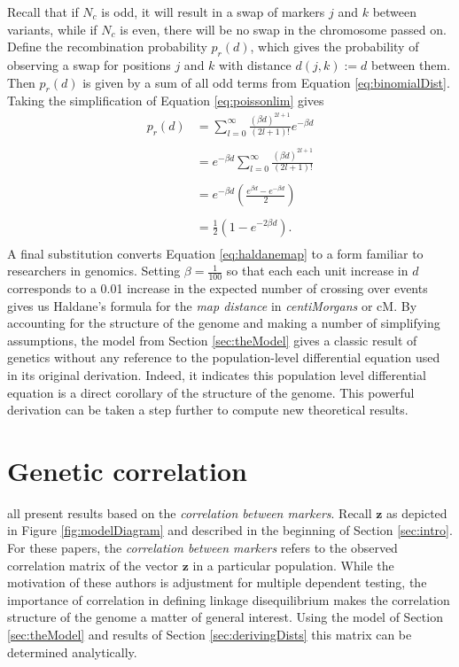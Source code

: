 \documentclass{article}
\newcommand{\ve}[1]{\mathbf{#1}}           %
\begin{document}
Recall that if $N_c$ is odd, it will result in a swap of markers $j$ and $k$ between variants, while if $N_c$ is even, there will be no swap in the chromosome passed on. Define the recombination probability $p_r(d)$, which gives the probability of observing a swap for positions $j$ and $k$ with distance $d(j,k) := d$ between them. Then $p_r(d)$ is given by a sum of all odd terms from Equation \ref{eq:binomialDist}. Taking the simplification of Equation \ref{eq:poissonlim} gives
\begin{equation} \label{eq:haldanemap}
  \begin{split}
    p_r(d) & = \sum_{l = 0}^{\infty} \frac{(\beta d)^{2l + 1}}{(2l + 1)!} e^{-\beta d} \\
    & \\
    & = e^{-\beta d} \sum_{l = 0}^{\infty} \frac{(\beta d)^{2l + 1}}{(2l + 1)!} \\
    & \\
    & = e^{-\beta d} \left ( \frac{e^{\beta d} - e^{- \beta d}}{2} \right ) \\
    & \\
    & = \frac{1}{2} \left ( 1 - e^{-2 \beta d} \right ) .\\
  \end{split}
\end{equation}
A final substitution converts Equation \ref{eq:haldanemap} to a form familiar to researchers in genomics. Setting $\beta = \frac{1}{100}$ so that each each unit increase in $d$ corresponds to a 0.01 increase in the expected number of crossing over events gives us Haldane's formula for the \textit{map distance} in \textit{centiMorgans} or cM. By accounting for the structure of the genome and making a number of simplifying assumptions, the model from Section \ref{sec:theModel} gives a classic result of genetics without any reference to the population-level differential equation used in its original derivation. Indeed, it indicates this population level differential equation is a direct corollary of the structure of the genome. This powerful derivation can be taken a step further to compute new theoretical results. 

\section{Genetic correlation} \label{sec:correlation}

\cite{cheverud2001, LiJi2005, Galwey2009} all present results based on the \emph{correlation between markers}. Recall $\ve{z}$ as depicted in Figure \ref{fig:modelDiagram} and described in the beginning of Section \ref{sec:intro}. For these papers, the \emph{correlation between markers} refers to the observed correlation matrix of the vector $\ve{z}$ in a particular population. While the motivation of these authors is adjustment for multiple dependent testing, the importance of correlation in defining linkage disequilibrium makes the correlation structure of the genome a matter of general interest. Using the model of Section \ref{sec:theModel} and results of Section \ref{sec:derivingDists} this matrix can be determined analytically.
\end{document}
